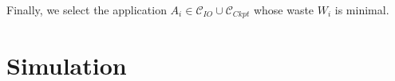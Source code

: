 \documentclass[conference]{IEEEtran}
\newcommand{\muind}{\mu_{\text{ind}}}
\newcommand{\period}[1]{P_{#1}}
\newcommand{\wap}[1]{W_{#1}}
\newcommand{\IOcat}{\textsc{IO-Candidate}\xspace}
\newcommand{\Ckptcat}{\textsc{Ckpt-Candidate}\xspace}
\newcommand{\Catiocat}{\mathcal{C}_{IO}\xspace}
\newcommand{\Catckptcat}{\mathcal{C}_{Ckpt}\xspace}
\begin{document}
 Finally, we select the application $A_{i} \in \Catiocat \cup \Catckptcat$ whose waste
 $\wap{i}$ is minimal.


%
%
%
%


\section{Simulation}\label{sec:simulator}
\end{document}
